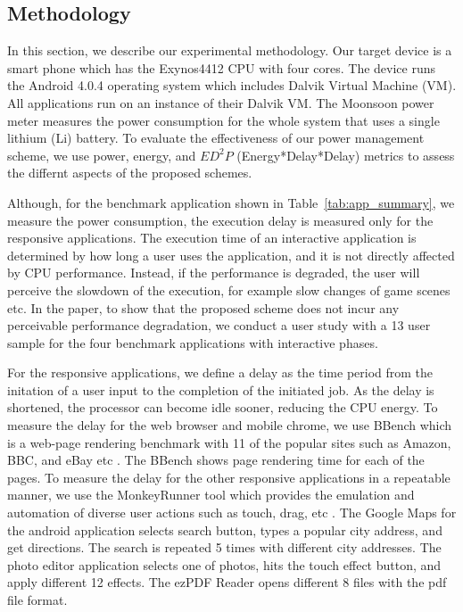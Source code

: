 \subsection{Methodology}
In this section, we describe our experimental methodology. 
Our target device is a smart phone which has the Exynos4412 CPU with four cores.
The device runs the Android 4.0.4 operating system which includes Dalvik Virtual Machine (VM). 
All applications run on an instance of their Dalvik VM. 
The Moonsoon power meter measures the power consumption for the whole system that uses a single lithium (Li) battery. 
To evaluate the effectiveness of our power management scheme, we use power, energy, and $ED^2P$ (Energy*Delay*Delay) metrics to assess
the differnt aspects of the proposed schemes.

Although, for the benchmark application shown in Table~\ref{tab:app_summary}, we measure the power consumption, the execution
delay is measured only for the responsive applications. The execution time of an interactive application is determined by
how long a user uses the application, and it is not directly affected by CPU performance. Instead, if the performance
is degraded, the user will perceive the slowdown of the execution, for example slow changes of game scenes etc.
In the paper, to show that the proposed scheme does not incur any perceivable performance degradation, we 
conduct a user study with a 13 user sample for the four benchmark applications with interactive phases.

For the responsive applications, we define a delay as the time period from the initation of a user input to the completion
of the initiated job. As the delay is shortened, the processor can become idle sooner, reducing the CPU energy.
To measure the delay for the web browser and mobile chrome, 
we use BBench which is a web-page rendering benchmark with 11 of the popular sites such as Amazon, BBC, and eBay etc \cite{characterinteractive}. 
The BBench shows page rendering time for each of the pages. 
To measure the delay for the other responsive applications in a repeatable manner, we use the MonkeyRunner tool which 
provides the emulation and automation of diverse user actions such as touch, drag, etc \cite{monkeyrunner}.
The Google Maps for the android application selects search button, types a popular city address, and get directions. 
The search is repeated 5 times with different city addresses. 
The photo editor application selects one of photos, hits the touch effect button, and apply different 12 effects. 
The ezPDF Reader opens different 8 files with the pdf file format.

